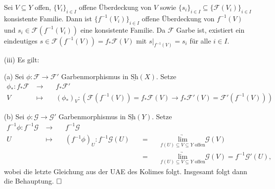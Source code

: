 \documentclass[11pt]{book}
\theoremstyle{nonumberbreak}
\newenvironment{pr}[1][]{\ifthenelse{\equal{#1}{}}{\proof}{\proof[#1]}\rm}{\endproof}
\newenvironment{bemdefin}[1][]{\ifthenelse{\equal{#1}{}}{\bemdefini}{\bemdefini[#1]}\rm}{\endbemdefini}
\begin{document}
\begin{spacing}{1.4}
\begin{bemdefin}
\begin{pr}
\begin{compactenum}
\item Sei $V \subseteq Y$ offen, $\{V_i\}_{i \in I}$ offene Überdeckung von $V$ sowie $\{s_i\}_{i \in I} \subseteq \{\mathcal{F}(V_i)\}_{i \in I}$ konsistente Familie. Dann ist $\{f^{-1}(V_i)\}_{i \in I}$ offene Überdeckung von $f^{-1}(V)$ und $s_i \in \mathcal{F}\left(f^{-1}(V_i)\right)$ eine konsistente Familie. Da $\mathcal{F}$ Garbe ist, existiert ein eindeutiges $s \in \mathcal{F}\left(f^{-1}(V)\right)=f_{*}\mathcal{F}(V)$ mit $s \vert_{f^{-1}(V)}=s_i$ für alle $i \in I$.
\item[(iii)] Es gilt:
\begin{compactenum}
\item[(a)] Sei $\phi: \mathcal{F} \longrightarrow \mathcal{F}'$ Garbenmorphismus in $\underline{\textrm{Sh}}(X)$. Setze
\setlength{\abovedisplayskip}{5.5pt}
\setlength{\belowdisplayskip}{5.5pt}
\begin{alignat*}{5}
\phi_{*}: f_{*}\mathcal{F}\ & \longrightarrow&& \ f_{*}\mathcal{F}' \\
V\ & \mapsto&& \ \left(\phi_*\right)_V: \left( \mathcal{F}\left(f^{-1}(V)\right) = f_{*}\mathcal{F}(V) \longrightarrow f_{*}\mathcal{F}'(V) = \mathcal{F}'\left( f^{-1}(V)\right)  \right) 
\end{alignat*}
\item[(b)] Sei $\phi: \mathcal{G} \longrightarrow \mathcal{G}'$ Garbenmorphismus in $\underline{\textrm{Sh}}(Y)$. Setze
\setlength{\abovedisplayskip}{5.5pt}
\setlength{\belowdisplayskip}{5.5pt}
\begin{alignat*}{5}
f^{-1}\phi: f^{-1}\mathcal{G}\ & \longrightarrow&& \ f^{-1}\mathcal{G}&&&&\\
U \ & \mapsto&& \ \left(f^{-1}\phi\right)_U : f^{-1} \mathcal{G}(U)\ &&=&& \ \underset{f(U) \subseteq V \subseteq Y \textrm{ offen}}{\underrightarrow{\textrm{lim}}} \mathcal{G}(V) \\
&&&&&=&& \ \underset{f(U) \subseteq V \subseteq Y \textrm{ offen}}{\underrightarrow{\textrm{lim}}} \mathcal{G}(V) = f^{-1}\mathcal{G}'(U),
\end{alignat*}
wobei die letzte Gleichung aus der UAE des Kolimes folgt. Insgesamt folgt dann die Behauptung. $\hfill \Box$

\end{compactenum}
\end{compactenum}

\end{pr}


\end{bemdefin}
\end{spacing}
\end{document}
